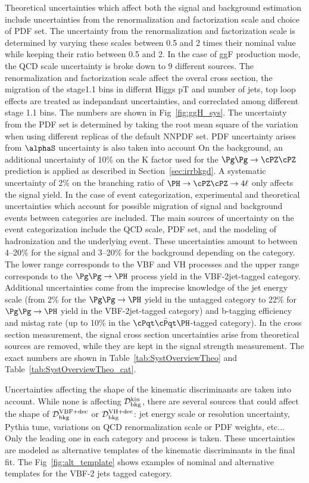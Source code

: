 Theoretical uncertainties which affect both the signal and background estimation 
include uncertainties from the renormalization and factorization scale and choice of PDF set. 
The uncertainty from the renormalization and factorization scale is determined by varying these scales between 
0.5 and 2 times their nominal value while keeping their ratio between 0.5 and 2. In the case of ggF production mode, the QCD scale uncertainty is broke down to 9 different sources. The renormalization and factorization scale affect the overal cross section, the migration of the stage1.1 bins in differnt Higgs pT and number of jets, top loop effects are treated as indepandant uncertainties, and correclated among different stage 1.1 bins. The numbers are shown in Fig~\ref{fig:ggH_sys}. 
The uncertainty from the PDF set is determined 
by taking the root mean square of the variation when using different replicas of the default NNPDF set. PDF uncertainty arises from $\alphaS$ uncertainty is also taken into account 
On the background, an additional uncertainty of 10\% on the K factor used for the $\ggZZ$ prediction is applied as described in Section~\ref{sec:irrbkgd}.
A systematic uncertainty of 2\% on the branching ratio of $\HZZfl$ only affects the signal yield. 
In the case of event categorization, experimental and theoretical uncertainties which account for
possible migration of signal and background events between categories are included. The main sources 
of uncertainty on the event categorization include the QCD scale, PDF set, and the modeling of hadronization and the underlying 
event. These uncertainties amount to between 4--20\% for the signal and 3--20\% for the background depending on the category.
The lower range corresponds to the VBF and VH processes and the upper range corresponds to the $\ggH$ process yield in the VBF-2jet-tagged category. 
Additional uncertainties come from the imprecise knowledge of the jet energy scale (from 2\% for the $\ggH$ yield in the untagged category to 22\% for  $\ggH$ yield in the VBF-2jet-tagged category) and b-tagging efficiency and mistag 
rate (up to 10\% in the $\ttH$-tagged category). 
In the cross section measurement, the signal cross section uncertainties arise from theoretical sources are removed, while they are kept in the signal strength measurement. The exact numbers are shown in Table~\ref{tab:SystOverviewTheo} and Table~\ref{tab:SystOverviewTheo_cat}. 

Uncertainties affecting the shape of the kinematic discriminants are taken into account. While none is affecting ${\cal D}^{\rm kin}_{\rm bkg}$, there are several sources that could affect the shape of ${\mathcal{D}}^{\mathrm{VBF}+\mathrm{dec}}_{\mathrm{bkg}}$ or ${\mathcal{D}}^{\mathrm{VH}+\mathrm{dec}}_{\mathrm{bkg}}$: jet energy scale or resolution uncertainty, Pythia tune, variations on QCD renormalization scale or PDF weights, etc... Only the leading one in each category and process is taken. These uncertainties are modeled as alternative templates of the kinematic discriminants in the final fit. The Fig~\ref{fig:alt_template} shows examples of nominal and alternative templates for the VBF-2 jets tagged category.


